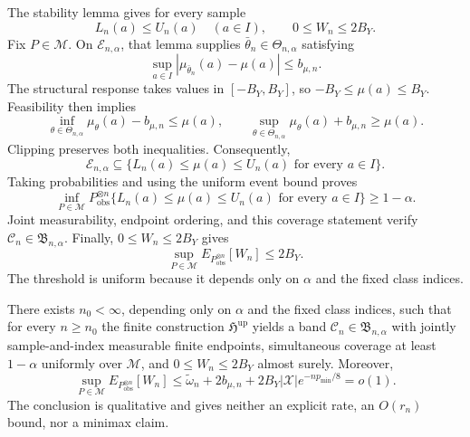 The stability lemma gives for every sample
\[
 L_n(a)\le U_n(a)\quad(a\in I),
 \qquad0\le W_n\le2B_Y.
\]
Fix \(P\in\mathcal M\). On \(\mathcal E_{n,\alpha}\), that lemma supplies \(\bar\theta_n\in\Theta_{n,\alpha}\) satisfying
\[
 \sup_{a\in I}|\mu_{\bar\theta_n}(a)-\mu(a)|\le b_{\mu,n}.
\]
The structural response takes values in \([-B_Y,B_Y]\), so \(-B_Y\le\mu(a)\le B_Y\). Feasibility then implies
\[
 \inf_{\theta\in\Theta_{n,\alpha}}\mu_\theta(a)-b_{\mu,n}\le\mu(a),
 \qquad
 \sup_{\theta\in\Theta_{n,\alpha}}\mu_\theta(a)+b_{\mu,n}\ge\mu(a).
\]
Clipping preserves both inequalities. Consequently,
\[
 \mathcal E_{n,\alpha}\subseteq
 \{L_n(a)\le\mu(a)\le U_n(a)\text{ for every }a\in I\}.
\]
Taking probabilities and using the uniform event bound proves
\[
 \inf_{P\in\mathcal M}P_{\mathrm{obs}}^{\otimes n}
 \{L_n(a)\le\mu(a)\le U_n(a)\text{ for every }a\in I\}
 \ge1-\alpha.
\]
Joint measurability, endpoint ordering, and this coverage statement verify \(\mathcal C_n\in\mathfrak B_{n,\alpha}\). Finally, \(0\le W_n\le2B_Y\) gives
\[
 \sup_{P\in\mathcal M}E_{P_{\mathrm{obs}}^{\otimes n}}[W_n]\le2B_Y.
\]
The threshold is uniform because it depends only on \(\alpha\) and the fixed class indices.

There exists \(n_0<\infty\), depending only on \(\alpha\) and the fixed class indices, such that for every \(n\ge n_0\) the finite construction \(\mathfrak H^{\mathrm{up}}\) yields a band \(\mathcal C_n\in\mathfrak B_{n,\alpha}\) with jointly sample-and-index measurable finite endpoints, simultaneous coverage at least \(1-\alpha\) uniformly over \(\mathcal M\), and \(0\le W_n\le2B_Y\) almost surely. Moreover,
\[
 \sup_{P\in\mathcal M}E_{P_{\mathrm{obs}}^{\otimes n}}[W_n]
 \le \widetilde\omega_n+2b_{\mu,n}
   +2B_Y|\mathcal X|e^{-np_{\min}/8}=o(1).
\]
The conclusion is qualitative and gives neither an explicit rate, an \(O(r_n)\) bound, nor a minimax claim.

